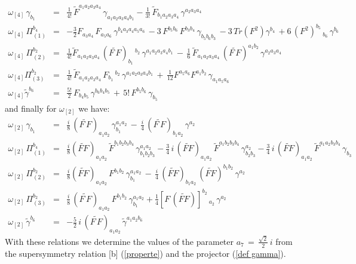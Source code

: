\documentclass[a4paper,11pt]{article}
\def\tilde{\widetilde}
\begin{document}
\begin{eqnarray}
\omega_{[4]} \, \gamma_{b_1} & = & \frac{1}{4!} \, {\tilde{F}}^{a_1 a_2 a_3 a_4} \,
\gamma_{a_1 a_2 a_3 a_4 b_1} - \frac{1}{3!} \, {\tilde{F}}_{b_1 a_2 a_3 a_4} \,
\gamma^{a_2 a_3 a_4} \nonumber \\
\omega_{[4]} \, \Pi_{(1)}^{b_4} & = & - \frac{3}{2} F_{a_3 a_4} \, F_{a_5 a_6} \,
\gamma^{b_4 a_3 a_4 a_5 a_6} \, -3 \, F^{b_5 b_6} \, F^{b_3 b_4} \,
\gamma_{b_5 b_6 b_3} \, -3 \, Tr(F^{2}) \gamma^{b_4} \, +6 \, (F^2)^{b_5} \, _{b_6}
\, \gamma^{b_6} \nonumber \\
\omega_{[4]} \, \Pi_{(2)}^{b_2} & = & \frac{1}{4!} {\tilde F}_{a_1 a_2 a_3 a_4} \,
({\tilde {F \, F}})_{b_1} \, ^{b_2} \, \gamma ^{a_1 a_2 a_3 a_4 b_1} \, - \,
\frac{1}{6} \, {\tilde F}_{a_1 a_2 a_3 a_4} \, ({\tilde {F \, F}})^{a_1 b_2} \,
\gamma^{a_2 a_3 a_4} \nonumber \\
\omega_{[4]} \Pi_{(3)}^{b_2} & = & \frac{1}{4!} \, {\tilde F}_{a_1 a_2 a_3 a_4}
\, F_{b_1} \, ^{b_2} \, \gamma^{a_1 a_2 a_3 a_4 b_1} \, + \,
\frac{1}{12} F^{a_5 a_6} F^{a_1 b_2} \, \gamma_{a_1 a_5 a_6}\nonumber \\
\omega_{[4]} {\tilde \gamma^{b_6}} & = & \frac{5!}{2} \, F_{b_4 b_5} \,
\gamma^{b_6 b_4 b_5} \, + \, 5! \, F^{b_5 b_6} \, \gamma_{b_5}
\label{susy om4}
\end{eqnarray}
and finally for $\omega_{[2]}$ we have:
\begin{eqnarray}
\omega_{[2]} \, \gamma_{b_1} & = & \frac{i}{8} \, ({\tilde{F \, F}})_{a_1 a_2} \,
\gamma^{a_1 a_2}_{b_1} \, - \, \frac{i}{4} \, ({\tilde{F \, F}})_{b_1 a_2} \,
\gamma^{a_2} \nonumber \\
\omega_{[2]} \, \Pi_{(1)}^{b_4} & = & \frac{i}{8}  ({\tilde{F F}})_{a_1 a_2} \,
 {\tilde F}^{b_1 b_2 b_3 b_4} \, \gamma^{a_1 a_2}_{b_1 b_2 b_3}  -
\frac{3}{4} \, i \, ({\tilde{F F}})_{a_1 a_2} \, {\tilde F}^{a_1 b_2 b_3 b_4} \,
\gamma^{a_2}_{b_2 b_3} - \frac{3}{4} \, i \, ({\tilde{F F}})_{a_1 a_2} \,
{\tilde F}^{a_1 a_2 b_3 b_4} \, \gamma_{b_3} \nonumber \\
\omega_{[2]} \, \Pi_{(2)}^{b_2} & = & \frac{i}{8} ({\tilde{F F}})_{a_1 a_2} \,
 F^{b_1 b_2} \, \gamma^{a_1 a_2}_{b_1} \, - \, \frac{i}{4} \, ({\tilde{F F}})_{b_1 a_2} \,
  ({\tilde{F F}})^{b_1 b_2} \, \gamma^{a_2} \nonumber \\
\omega_{[2]} \, \Pi_{(3)}^{b_2} & = & \frac{i}{8} \, ({\tilde{F \, F}})_{a_1 a_2} \,
 F^{b_1 b_2} \, \gamma^{a_1 a_2}_{b_1} + \frac{1}{4} [F \, ({\tilde{F F}})]^{b_2} \, _{a_2} \,
 \gamma^{a_2} \nonumber \\
\omega_{[2]} \, {\tilde \gamma^{b_6}} & = & - \frac{5}{2} \, i \, ({\tilde{F \, F}})_{a_1 a_2}
\, {\tilde \gamma^{a_1 a_2 b_6}}
\label{susy om2}
\end{eqnarray}
With these relations we determine the values of the parameter
$a_7 \, = \, \frac{\sqrt{2}}{2} \, i$ from the supersymmetry relation [b]
 (\ref{properte}) and the projector (\ref{def gamma}).
\end{document}
